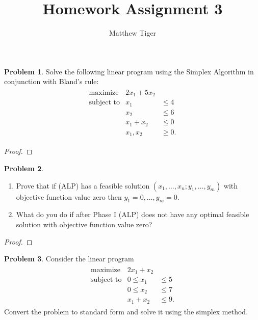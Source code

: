 \documentclass[12pt]{article}
\title{Homework Assignment 3}
\author{Matthew Tiger}
\theoremstyle{definition}
\newtheorem{problem}{Problem}
\begin{document}
\maketitle


\begin{problem}
  Solve the following linear program using the Simplex Algorithm in conjunction
  with Bland's rule:
  \begin{align*}
    \begin{array}{rrl}
      \text{maximize} & 2x_1 + 5x_2 &\\
      \text{subject to} & x_1 &\leq 4 \\
      & x_2 &\leq 6 \\
      & x_1 + x_2 &\leq 0 \\
      & x_1, x_2 &\geq 0.
    \end{array}
  \end{align*}
\end{problem}

\begin{proof}
\end{proof}
\newpage


\begin{problem}
  \begin{enumerate}
    \item Prove that if (ALP) has a feasible solution $(x_1, \dots, x_n; y_1, \dots, y_m)$
      with objective function value zero then $y_1 = 0, \dots, y_m = 0$.
    \item What do you do if after Phase I (ALP) does not have any optimal feasible
      solution with objective function value zero?
  \end{enumerate}
\end{problem}

\begin{proof}
\end{proof}
\newpage


\begin{problem}
  Consider the linear program
  \begin{align*}
    \begin{array}{rrl}
      \text{maximize} & 2x_1 + x_2 &\\
      \text{subject to} & 0 \leq x_1 &\leq 5 \\
      & 0 \leq x_2 &\leq 7 \\
      & x_1 + x_2 &\leq 9.
    \end{array}
  \end{align*}
  Convert the problem to standard form and solve it using the simplex method.
\end{problem}
\end{document}
